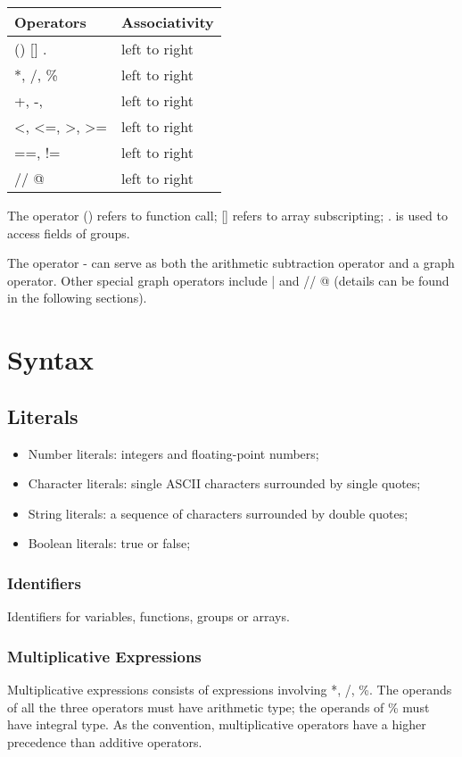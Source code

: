 \documentclass[11pt,letterpaper]{article}
\begin{document}
\begin{center}
    \begin{tabular}{| p{4cm} | p{4cm} |}		\hline
    Operators 		& Associativity \\ 		\hline \hline
    () [] . 			& left to right \\ 		\hline
    *, /, \% 		& left to right \\ 		\hline
    +, -, \textbar	& left to right \\ 		\hline
    \textless,  \textless=,  \textgreater,  \textgreater=	& left to right \\ 		\hline
    ==,  !=			& left to right \\ 		\hline
    // @				& left to right \\ 		\hline
    
    \end{tabular}
\end{center}

The operator () refers to function call; [] refers to array subscripting; . is used to access fields of groups. 

The operator - can serve as both the arithmetic subtraction operator and a graph operator.  Other special graph operators include | and // @ (details can be found in the following sections).

\section {Syntax}
\subsection {Literals}
\begin{itemize}
\item Number literals: integers and floating-point numbers;
\item Character literals: single ASCII characters surrounded by single quotes;
\item String literals: a sequence of characters surrounded by double quotes;
\item Boolean literals: true or false;
\end{itemize}
\subsubsection {Identifiers}
Identifiers for variables, functions, groups or arrays.

\subsubsection {Multiplicative Expressions}
Multiplicative expressions consists of expressions involving *, /, \%. The operands of all the three operators must have arithmetic type; the operands of \% must have integral type. As the convention, multiplicative operators have a higher precedence than additive operators. 
\end{document}
